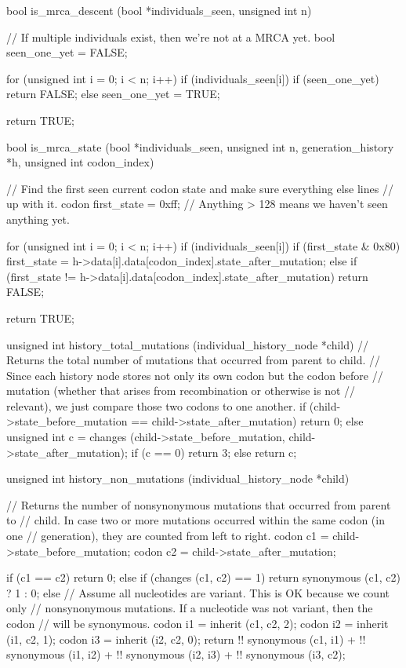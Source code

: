 \documentclass{article}
\begin{document}
\begin{ccode}
bool is_mrca_descent (bool *individuals_seen, unsigned int n) {
  // If multiple individuals exist, then we’re not at a MRCA yet.
  bool seen_one_yet = FALSE;

  for (unsigned int i = 0; i < n; i++)
    if (individuals_seen[i]) {
      if (seen_one_yet)
	return FALSE;
      else
	seen_one_yet = TRUE;
    }

  return TRUE;
}

bool is_mrca_state (bool *individuals_seen, unsigned int n, generation_history *h,
		    unsigned int codon_index) {
  // Find the first seen current codon state and make sure everything else lines
  // up with it.
  codon first_state = 0xff; // Anything > 128 means we haven’t seen anything yet.

  for (unsigned int i = 0; i < n; i++)
    if (individuals_seen[i]) {
      if (first_state & 0x80)
	first_state = h->data[i].data[codon_index].state_after_mutation;
      else if (first_state != h->data[i].data[codon_index].state_after_mutation)
	return FALSE;
    }

  return TRUE;
}

unsigned int history_total_mutations (individual_history_node *child) {
  // Returns the total number of mutations that occurred from parent to child.
  // Since each history node stores not only its own codon but the codon before
  // mutation (whether that arises from recombination or otherwise is not
  // relevant), we just compare those two codons to one another.
  if (child->state_before_mutation == child->state_after_mutation)
    return 0;
  else {
    unsigned int c = changes (child->state_before_mutation, child->state_after_mutation);
    if (c == 0)
      return 3;
    else
      return c;
  }
}

unsigned int history_non_mutations (individual_history_node *child) {
  // Returns the number of nonsynonymous mutations that occurred from parent to
  // child. In case two or more mutations occurred within the same codon (in one
  // generation), they are counted from left to right.
  codon c1 = child->state_before_mutation;
  codon c2 = child->state_after_mutation;

  if (c1 == c2)
    return 0;
  else if (changes (c1, c2) == 1)
    return synonymous (c1, c2) ? 1 : 0;
  else {
    // Assume all nucleotides are variant. This is OK because we count only
    // nonsynonymous mutations. If a nucleotide was not variant, then the codon
    // will be synonymous.
    codon i1 = inherit (c1, c2, 2);
    codon i2 = inherit (i1, c2, 1);
    codon i3 = inherit (i2, c2, 0);
    return !! synonymous (c1, i1) + !! synonymous (i1, i2) +
	   !! synonymous (i2, i3) + !! synonymous (i3, c2);
  }
}


\end{ccode}
\end{document}
